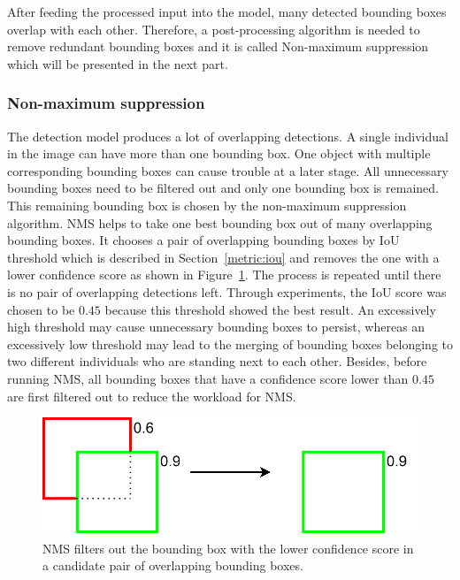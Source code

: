 \documentclass[../main.tex]{subfiles}
\begin{document}
After feeding the processed input into the model, many detected bounding boxes overlap with each other. Therefore, a post-processing algorithm is needed to remove redundant bounding boxes and it is called Non-maximum suppression which will be presented in the next part.


\subsubsection{Non-maximum suppression}
The detection model produces a lot of overlapping detections. A single individual in the image can have more than one bounding box. One object with multiple corresponding bounding boxes can cause trouble at a later stage. All unnecessary bounding boxes need to be filtered out and only one bounding box is remained. This remaining bounding box is chosen by the non-maximum suppression algorithm. NMS helps to take one best bounding box out of many overlapping bounding boxes. It chooses a pair of overlapping bounding boxes by IoU threshold which is described in Section~\ref{metric:iou} and removes the one with a lower confidence score as shown in Figure~\ref{fig:nms_score}. The process is repeated until there is no pair of overlapping detections left. Through experiments, the IoU score was chosen to be $0.45$ because this threshold showed the best result. An excessively high threshold may cause unnecessary bounding boxes to persist, whereas an excessively low threshold may lead to the merging of bounding boxes belonging to two different individuals who are standing next to each other. Besides, before running NMS, all bounding boxes that have a confidence score lower than $0.45$ are first filtered out to reduce the workload for NMS.

\begin{figure}[h!]
\centering
\includegraphics[width=0.8\linewidth]{Figure/nms_score.pdf}
\caption{NMS filters out the bounding box with the lower confidence score in a candidate pair of overlapping bounding boxes.}
\label{fig:nms_score}
\end{figure}
\end{document}
